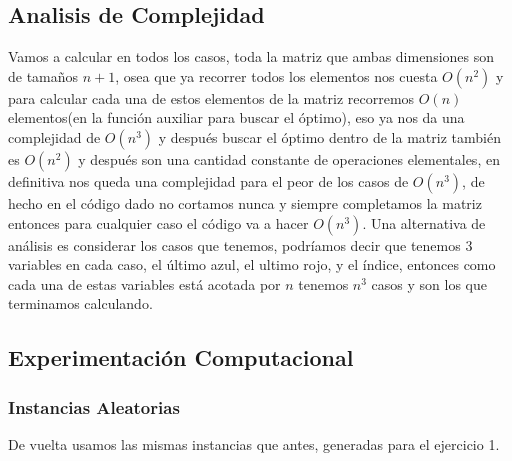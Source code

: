 \subsection*{Analisis de Complejidad}
Vamos a calcular en todos los casos, toda la matriz que ambas dimensiones son de tamaños $n+1$, osea que ya recorrer todos los elementos nos cuesta $O(n^2)$ y para calcular cada una de estos elementos de la matriz recorremos $O(n)$ elementos(en la función auxiliar para buscar el óptimo), eso ya nos da una complejidad de $O(n^3)$ y después buscar el óptimo dentro de la matriz también es $O(n^2)$ y después son una cantidad constante de operaciones elementales, en definitiva nos queda una complejidad para el peor de los casos de $O(n^3)$, de hecho en el código dado no cortamos nunca y siempre completamos la matriz entonces para cualquier caso el código va a hacer $O(n^3)$. Una alternativa de análisis es considerar los casos que tenemos, podríamos decir que tenemos 3 variables en cada caso, el último azul, el ultimo rojo, y el índice, entonces como cada una de estas variables está acotada por $n$ tenemos $n^3$ casos y son los que terminamos calculando.


\subsection*{Experimentación Computacional}
\subsubsection*{Instancias Aleatorias}
De vuelta usamos las mismas instancias que antes, generadas para el ejercicio 1.

